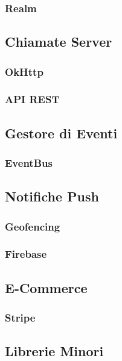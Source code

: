 \documentclass{article}
\begin{document}
\subsubsection{Realm}

\subsection{Chiamate Server}

\subsubsection{OkHttp}

\subsubsection{API REST}

\subsection{Gestore di Eventi}

\subsubsection{EventBus}

\subsection{Notifiche Push}

\subsubsection{Geofencing}

\subsubsection{Firebase}

\subsection{E-Commerce}

\subsubsection{Stripe}

\subsection{Librerie Minori}
\end{document}
